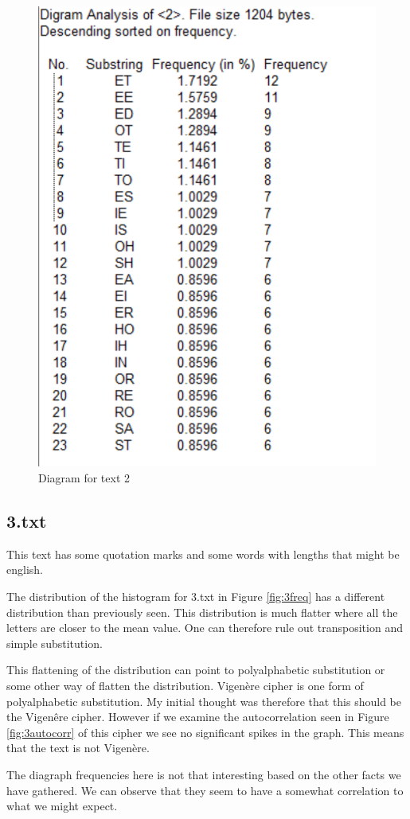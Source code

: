 \begin{figure}[ht!]
    \begin{center}
        \includegraphics[height=0.7\textwidth]{assets/2_diagram.png}
        \caption{Diagram for text 2}
        \label{fig:2diagram}
    \end{center}
\end{figure}

\newpage
\subsection*{3.txt}

This text has some quotation marks and some words with lengths that might be english.

The distribution of the histogram for 3.txt in Figure \ref{fig:3freq} has a different distribution than previously seen.
This distribution is much flatter where all the letters are closer to the mean value.
One can therefore rule out transposition and simple substitution.

This flattening of the distribution can point to polyalphabetic substitution or some other way of flatten the distribution.
Vigenère cipher is one form of polyalphabetic substitution.
My initial thought was therefore that this should be the Vigenêre cipher.
However if we examine the autocorrelation seen in Figure \ref{fig:3autocorr} of this cipher we see no significant spikes in the graph.
This means that the text is not Vigenère.

The diagraph frequencies here is not that interesting based on the other facts we have gathered.
We can observe that they seem to have a somewhat correlation to what we might expect.


